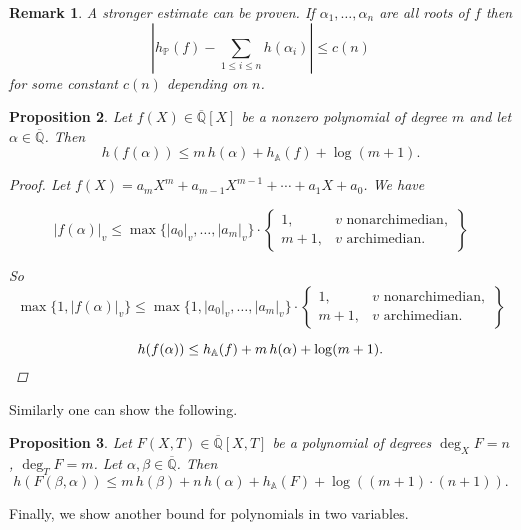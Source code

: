 \documentclass{article}
\newcommand{\QQ}{\mathbb{Q}}
\theoremstyle{myplain}
\newtheorem{proposition}{Proposition}[section]
\theoremstyle{mydefinition}
\newtheorem{remark}[proposition]{Remark}
\begin{document}
\begin{remark}
  A stronger estimate can be proven. If $\alpha_1, \ldots, \alpha_n$ are all
  roots of $f$ then
  \[ \left| h_\mathbb{P} (f) - \sum_{1 \le i \le n} h (\alpha_i) \right| \le c (n) \]
  for some constant $c (n)$ depending on $n$.
\end{remark}

\begin{proposition}
  Let $f (X) \in \overline{\QQ} [X]$ be a nonzero polynomial of degree $m$ and
  let $\alpha \in \overline{\QQ}$. Then
  \[ h (f(\alpha)) \le m\, h (\alpha) + h_\mathbb{A} (f) + \log (m+1). \]

  \begin{proof}
    Let $f (X) = a_m X^m + a_{m-1} X^{m-1} + \cdots + a_1 X + a_0$. We have

    \[ |f (\alpha)|_v \le \max \{ |a_0|_v, \ldots, |a_m|_v \} \cdot
      \left\{\begin{array}{ll}
               1, & v \text{ nonarchimedian},\\
               m+1, & v \text{ archimedian}.
             \end{array}\right\} \]

    So
    \[ \max \{ 1, |f (\alpha)|_v \} \le \max \{ 1, |a_0|_v, \ldots, |a_m|_v \} \cdot
      \left\{\begin{array}{ll}
               1, & v \text{ nonarchimedian},\\
               m+1, & v \text{ archimedian}.
             \end{array}\right\} \]

    \[ h (f (\alpha)) \le h_\mathbb{A} (f) + m\,h (\alpha) + \log (m+1). \qedhere \]
  \end{proof}
\end{proposition}

Similarly one can show the following.

\begin{proposition}\label{proposition:twovar-polynomial-value-height}
  Let $F (X,T) \in \overline{\QQ} [X,T]$ be a polynomial of degrees
  $\deg_X F = n$, $\deg_T F = m$. Let $\alpha, \beta \in \overline{\QQ}$. Then
  \[ h (F (\beta,\alpha)) \le m \, h (\beta) + n \, h (\alpha) + h_\mathbb{A} (F) + \log ((m+1)\cdot (n+1)). \]
\end{proposition}

Finally, we show another bound for polynomials in two variables.
\end{document}

